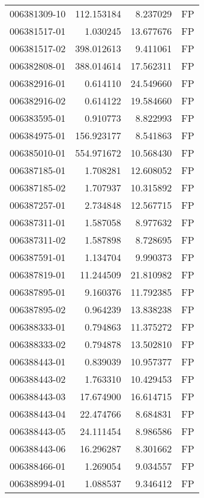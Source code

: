 \begin{tabular}{lrrl}
006381309-10 &  112.153184 &       8.237029 &   FP \\
006381517-01 &    1.030245 &      13.677676 &   FP \\
006381517-02 &  398.012613 &       9.411061 &   FP \\
006382808-01 &  388.014614 &      17.562311 &   FP \\
006382916-01 &    0.614110 &      24.549660 &   FP \\
006382916-02 &    0.614122 &      19.584660 &   FP \\
006383595-01 &    0.910773 &       8.822993 &   FP \\
006384975-01 &  156.923177 &       8.541863 &   FP \\
006385010-01 &  554.971672 &      10.568430 &   FP \\
006387185-01 &    1.708281 &      12.608052 &   FP \\
006387185-02 &    1.707937 &      10.315892 &   FP \\
006387257-01 &    2.734848 &      12.567715 &   FP \\
006387311-01 &    1.587058 &       8.977632 &   FP \\
006387311-02 &    1.587898 &       8.728695 &   FP \\
006387591-01 &    1.134704 &       9.990373 &   FP \\
006387819-01 &   11.244509 &      21.810982 &   FP \\
006387895-01 &    9.160376 &      11.792385 &   FP \\
006387895-02 &    0.964239 &      13.838238 &   FP \\
006388333-01 &    0.794863 &      11.375272 &   FP \\
006388333-02 &    0.794878 &      13.502810 &   FP \\
006388443-01 &    0.839039 &      10.957377 &   FP \\
006388443-02 &    1.763310 &      10.429453 &   FP \\
006388443-03 &   17.674900 &      16.614715 &   FP \\
006388443-04 &   22.474766 &       8.684831 &   FP \\
006388443-05 &   24.111454 &       8.986586 &   FP \\
006388443-06 &   16.296287 &       8.301662 &   FP \\
006388466-01 &    1.269054 &       9.034557 &   FP \\
006388994-01 &    1.088537 &       9.346412 &   FP \\

\end{tabular}
